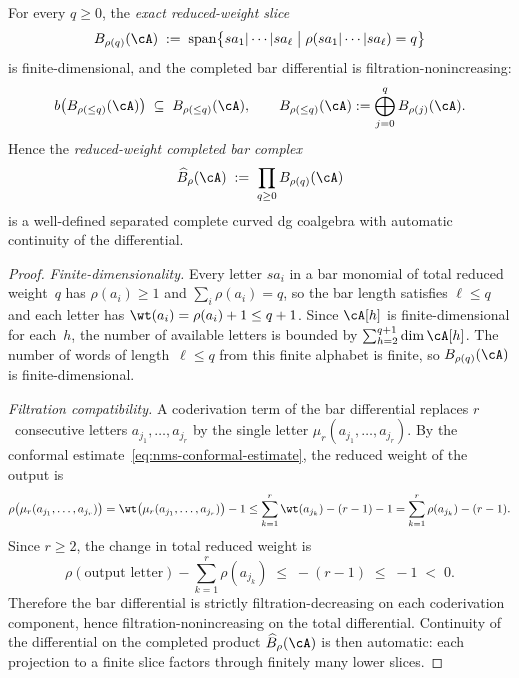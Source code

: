 \begin{theorem}
\label{thm:reduced-weight-finiteness}%
%
%
For every $q \geq 0$, the \emph{exact reduced-weight slice}
\begin{equation}\label{eq:nms-reduced-weight-slice}
B_{\rho(q)}(\cA)
\;:=\;
\operatorname{span}\bigl\{
 sa_1 | \cdots | sa_\ell
 \;\big|\;
 \rho(sa_1 | \cdots | sa_\ell) = q
\bigr\}
\end{equation}
is finite-dimensional, and the completed bar differential is
filtration-nonincreasing:
\begin{equation}\label{eq:nms-reduced-weight-filtration}
b\bigl(B_{\rho(\leq q)}(\cA)\bigr)
\;\subseteq\;
B_{\rho(\leq q)}(\cA),
\qquad
B_{\rho(\leq q)}(\cA)
:= \bigoplus_{j=0}^q B_{\rho(j)}(\cA).
\end{equation}
Hence the \emph{reduced-weight completed bar complex}
\[
\widehat{B}_\rho(\cA)
\;:=\;
\prod_{q \geq 0} B_{\rho(q)}(\cA)
\]
is a well-defined separated complete curved dg coalgebra with
automatic continuity of the differential.
\end{theorem}

\begin{proof}
\emph{Finite-dimensionality.}
Every letter $sa_i$ in a bar monomial of total reduced weight~$q$
has $\rho(a_i) \geq 1$ and $\sum_i \rho(a_i) = q$, so the bar
length satisfies $\ell \leq q$ and each letter has
$\wt(a_i) = \rho(a_i) + 1 \leq q + 1$. Since $\cA[h]$ is
finite-dimensional for each~$h$, the number of available letters is
bounded by $\sum_{h=2}^{q+1} \dim \cA[h]$. The number of words of
length~$\ell \leq q$ from this finite alphabet is finite, so
$B_{\rho(q)}(\cA)$ is finite-dimensional.

\emph{Filtration compatibility.}
A coderivation term of the bar differential replaces $r$~consecutive
letters $a_{j_1},\ldots,a_{j_r}$ by the single letter
$\mu_r(a_{j_1},\ldots,a_{j_r})$. By the conformal
estimate~\eqref{eq:nms-conformal-estimate}, the reduced weight of
the output is
\[
\rho\bigl(\mu_r(a_{j_1},\ldots,a_{j_r})\bigr)
= \wt\bigl(\mu_r(a_{j_1},\ldots,a_{j_r})\bigr) - 1
\leq \sum_{k=1}^r \wt(a_{j_k}) - (r-1) - 1
= \sum_{k=1}^r \rho(a_{j_k}) - (r-1).
\]
Since $r \geq 2$, the change in total reduced weight is
\[
\rho(\text{output letter}) - \sum_{k=1}^r \rho(a_{j_k})
\;\leq\; -(r-1)
\;\leq\; -1 \;<\; 0.
\]
Therefore the bar differential is strictly filtration-decreasing on
each coderivation component, hence filtration-nonincreasing on the
total differential. Continuity of the differential on the completed
product $\widehat{B}_\rho(\cA)$ is then automatic: each projection
to a finite slice factors through finitely many lower slices.
\end{proof}

